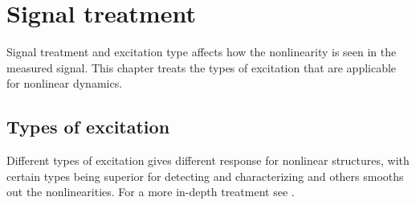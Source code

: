 
\chapter{Signal treatment}
\label{cha:signal-treatment}

Signal treatment and excitation type affects how the nonlinearity is seen in the
measured signal.
This chapter treats the types of excitation that are applicable for nonlinear
dynamics.

\section{Types of excitation}
\label{sec:types-excitation}

Different types of excitation gives different response for nonlinear structures,
with certain types being superior for detecting and characterizing and others
smooths out the nonlinearities. For a more in-depth treatment see
\textcite{gatto2010flexible}.


